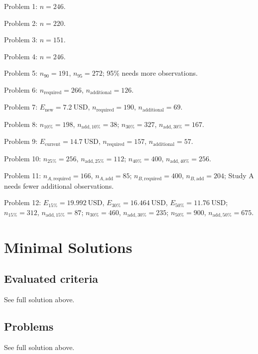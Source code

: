 	\begin{ExamProblems}
		\item Problem 1: $n=246$.
		\item Problem 2: $n=220$.
		\item Problem 3: $n=151$.
		\item Problem 4: $n=246$.
		\item Problem 5: $n_{90}=191$, $n_{95}=272$; 95\% needs more observations.
		\item Problem 6: $n_{\text{required}}=266$, $n_{\text{additional}}=126$.
		\item Problem 7: $E_{\text{new}}=7.2\ \text{USD}$, $n_{\text{required}}=190$, $n_{\text{additional}}=69$.
		\item Problem 8: $n_{10\%}=198$, $n_{\text{add},10\%}=38$; $n_{30\%}=327$, $n_{\text{add},30\%}=167$.
		\item Problem 9: $E_{\text{current}}=14.7\ \text{USD}$, $n_{\text{required}}=157$, $n_{\text{additional}}=57$.
		\item Problem 10: $n_{25\%}=256$, $n_{\text{add},25\%}=112$; $n_{40\%}=400$, $n_{\text{add},40\%}=256$.
		\item Problem 11: $n_{A,\text{required}}=166$, $n_{A,\text{add}}=85$; $n_{B,\text{required}}=400$, $n_{B,\text{add}}=204$; Study A needs fewer additional observations.
		\item Problem 12: $E_{15\%}=19.992\ \text{USD}$, $E_{30\%}=16.464\ \text{USD}$, $E_{50\%}=11.76\ \text{USD}$; $n_{15\%}=312$, $n_{\text{add},15\%}=87$; $n_{30\%}=460$, $n_{\text{add},30\%}=235$; $n_{50\%}=900$, $n_{\text{add},50\%}=675$.
	\end{ExamProblems}
	


\section{Minimal Solutions}

\subsection*{Evaluated criteria}
See full solution above.

\subsection*{Problems}
See full solution above.

